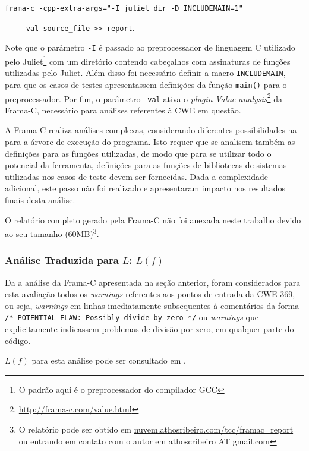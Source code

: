   \lstinline[mathescape=false]{frama-c -cpp-extra-args="-I juliet_dir -D INCLUDEMAIN=1"}

    \lstinline{    -val source_file >> report}.

    Note que o parâmetro \lstinline{-I} é passado ao preprocessador de linguagem C utilizado pelo Juliet\footnote{O padrão aqui é o preprocessador do compilador GCC} com um diretório contendo cabeçalhos com assinaturas de funções utilizadas pelo Juliet. Além disso foi necessário definir a macro \lstinline{INCLUDEMAIN}, para que os casos de testes apresentassem definições da função \lstinline{main()} para o preprocessador. Por fim, o parâmetro \lstinline{-val} ativa o \textit{plugin} \textit{Value analysis}\footnote{\url{http://frama-c.com/value.html}} da Frama-C, necessário para análises referentes à CWE em questão.

  A Frama-C realiza análises complexas, considerando diferentes possibilidades na para a árvore de execução do programa. Isto requer que se analisem também as definições para as funções utilizadas, de modo que para se utilizar todo o potencial da ferramenta, definições para as funções de bibliotecas de sistemas utilizadas nos casos de teste devem ser fornecidas. Dada a complexidade adicional, este passo não foi realizado e apresentaram impacto nos resultados finais desta análise.

  O relatório completo gerado pela Frama-C não foi anexada neste trabalho devido ao seu tamanho (60MB)\footnote{O relatório pode ser obtido em \url{nuvem.athosribeiro.com/tcc/framac_report} ou entrando em contato com o autor em athoscribeiro AT gmail.com}.

  \subsubsection{Análise Traduzida para $L$: $L(f)$}

  Da a análise da Frama-C apresentada na seção anterior, foram considerados para esta avaliação todos os \textit{warnings} referentes aos pontos de entrada da CWE 369, ou seja, \textit{warnings} em linhas imediatamente subsequentes à comentários da forma
  \lstinline{/* POTENTIAL FLAW: Possibly divide by zero */}
  ou \textit{warnings} que explicitamente indicassem problemas de divisão por zero, em qualquer parte do código.

  $L(f)$ para esta análise pode ser consultado em .

